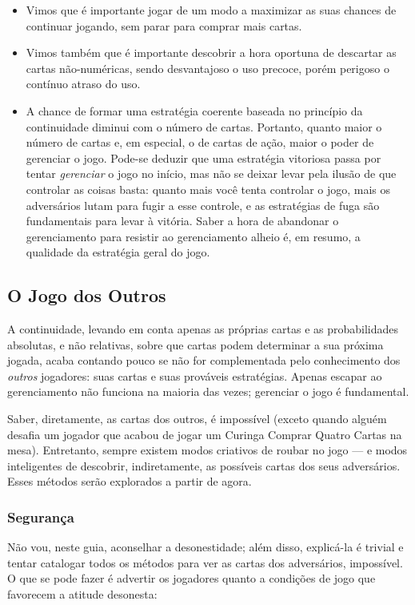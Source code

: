 \begin{itemize}
\item{Vimos que é importante jogar de um modo a maximizar as suas chances de continuar jogando, sem parar para comprar mais cartas.}
\item{Vimos também que é importante descobrir a hora oportuna de descartar as cartas não-numéricas, sendo desvantajoso o uso precoce, porém perigoso o contínuo atraso do uso.}
\item{A chance de formar uma estratégia coerente baseada no princípio da continuidade diminui com o número de cartas. Portanto, quanto maior o número de cartas e, em especial, o de cartas de ação, maior o poder de gerenciar o jogo. Pode-se deduzir que uma estratégia vitoriosa passa por tentar \textit{gerenciar} o jogo no início, mas não se deixar levar pela ilusão de que controlar as coisas basta: quanto mais você tenta controlar o jogo, mais os adversários lutam para fugir a esse controle, e as estratégias de fuga são fundamentais para levar à vitória. Saber a hora de abandonar o gerenciamento para resistir ao gerenciamento alheio é, em resumo, a qualidade da estratégia geral do jogo.}
\end{itemize}

\subsection{O Jogo dos Outros}

A continuidade, levando em conta apenas as próprias cartas e as probabilidades absolutas, e não relativas, sobre que cartas podem determinar a sua próxima jogada, acaba contando pouco se não for complementada pelo conhecimento dos \textit{outros} jogadores: suas cartas e suas prováveis estratégias. Apenas escapar ao gerenciamento não funciona na maioria das vezes; gerenciar o jogo é fundamental.

Saber, diretamente, as cartas dos outros, é impossível (exceto quando alguém desafia um jogador que acabou de jogar um Curinga Comprar Quatro Cartas na mesa). Entretanto, sempre existem modos criativos de roubar no jogo --- e modos inteligentes de descobrir, indiretamente, as possíveis cartas dos seus adversários. Esses métodos serão explorados a partir de agora.

\subsubsection{Segurança}

Não vou, neste guia, aconselhar a desonestidade; além disso, explicá-la é trivial e tentar catalogar todos os métodos para ver as cartas dos adversários, impossível. O que se pode fazer é advertir os jogadores quanto a condições de jogo que favorecem a atitude desonesta:

